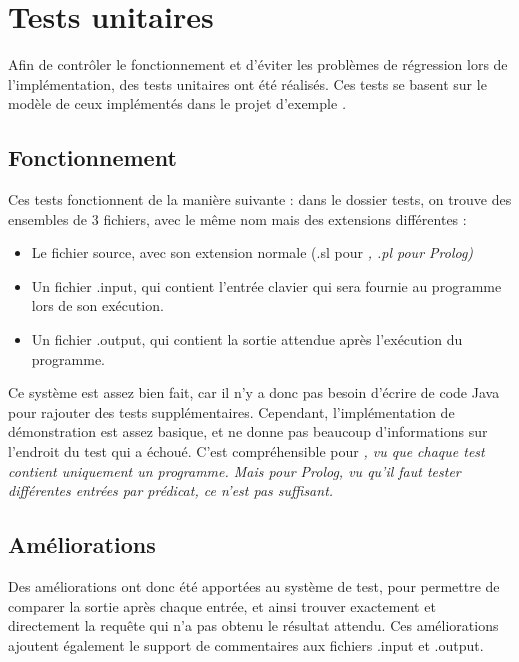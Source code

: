 \documentclass[../report.tex]{subfiles}
\begin{document}
\section{Tests unitaires}\label{sec:unittests}
Afin de contrôler le fonctionnement et d'éviter les problèmes de régression lors de l'implémentation, des tests unitaires ont été réalisés. Ces tests se basent sur le modèle de ceux implémentés dans le projet d'exemple \sl{}. 
\subsection{Fonctionnement}
Ces tests fonctionnent de la manière suivante : dans le dossier tests, on trouve des ensembles de 3 fichiers, avec le même nom mais des extensions différentes :
\begin{itemize}
    \item Le fichier source, avec son extension normale (.sl pour \sl{}, .pl pour Prolog)
    \item Un fichier .input, qui contient l'entrée clavier qui sera fournie au programme lors de son exécution.
    \item Un fichier .output, qui contient la sortie attendue après l'exécution du programme.
\end{itemize}
Ce système est assez bien fait, car il n'y a donc pas besoin d'écrire de code Java pour rajouter des tests supplémentaires. Cependant, l'implémentation de démonstration est assez basique, et ne donne pas beaucoup d'informations sur l'endroit du test qui a échoué. C'est compréhensible pour \sl{}, vu que chaque test contient uniquement un programme. Mais pour Prolog, vu qu'il faut tester différentes entrées par prédicat, ce n'est pas suffisant.
\subsection{Améliorations}
Des améliorations ont donc été apportées au système de test, pour permettre de comparer la sortie après chaque entrée, et ainsi trouver exactement et directement la requête qui n'a pas obtenu le résultat attendu. Ces améliorations ajoutent également le support de commentaires aux fichiers .input et .output.
\end{document}
